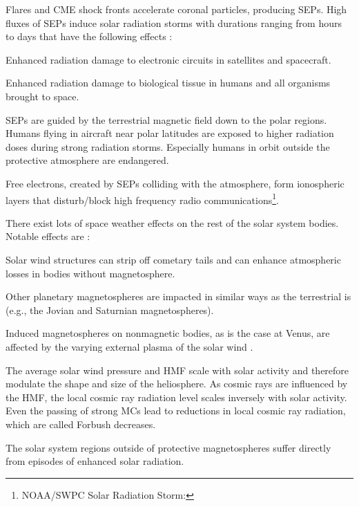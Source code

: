 Flares and CME shock fronts accelerate coronal particles, producing SEPs. High fluxes of SEPs induce solar radiation storms with durations ranging from hours to days that have the following effects \citep{Bothmer2007}:
\begin{itemize*}
	\item Enhanced radiation damage to electronic circuits in satellites and spacecraft.
	\item Enhanced radiation damage to biological tissue in humans and all organisms brought to space.
	\item SEPs are guided by the terrestrial magnetic field down to the polar regions. Humans flying in aircraft near polar latitudes are exposed to higher radiation doses during strong radiation storms. Especially humans in orbit outside the protective atmosphere are endangered.
	\item Free electrons, created by SEPs colliding with the atmosphere, form ionospheric layers that disturb/block high frequency radio communications\footnote{NOAA/SWPC Solar Radiation Storm: }.
\end{itemize*}

There exist lots of space weather effects on the rest of the solar system bodies. Notable effects are \citep{Bothmer2007}:
\begin{itemize*}
	\item Solar wind structures can strip off cometary tails and can enhance atmospheric losses in bodies without magnetosphere.
	\item Other planetary magnetospheres are impacted in similar ways as the terrestrial is (e.g., the Jovian and Saturnian magnetospheres).
	\item Induced magnetospheres on nonmagnetic bodies, as is the case at Venus, are affected by the varying external plasma of the solar wind \citep{Luhmann2004}.
	\item The average solar wind pressure and HMF scale with solar activity and therefore modulate the shape and size of the heliosphere. As cosmic rays are influenced by the HMF, the local cosmic ray radiation level scales inversely with solar activity. Even the passing of strong MCs lead to reductions in local cosmic ray radiation, which are called Forbush decreases.
	\item The solar system regions outside of protective magnetospheres suffer directly from episodes of enhanced solar radiation.
\end{itemize*}

